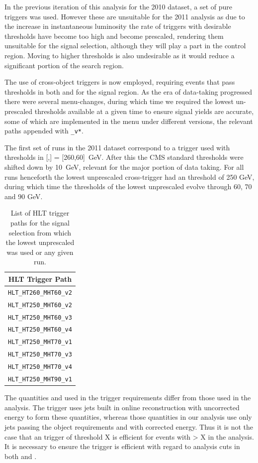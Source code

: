 In the previous iteration of this analysis for the 2010 dataset, a set of pure \HT triggers was used. However these are unsuitable for the 2011 analysis as due to the increase in instantaneous luminosity the rate of triggers with desirable thresholds have become too high and become prescaled, rendering them unsuitable for the signal selection, although they will play a part in the control region. Moving to higher \HT thresholds is also undesirable as it would reduce a significant portion of the search region. 

The use of cross-object triggers is now employed, requiring events that pass thresholds in both \HT and \mht for the signal region. As the era of data-taking progressed there were several menu-changes, during which time we required the lowest un-prescaled thresholds available at a given time to ensure signal yields are accurate, some of which are implemented in the menu under different versions, the relevant paths appended with \verb!_v*!. 

The first set of runs in the 2011 dataset correspond to a trigger used with thresholds in [\HT,\MHT] = [260,60]~GeV.  After this the CMS standard thresholds were shifted down by 10~GeV, relevant for the major portion of data taking. For all runs henceforth the lowest unprescaled cross-trigger had an \HT threshold of 250 GeV, during which time the \MHT thresholds of the lowest unprescaled evolve through 60, 70 and 90 GeV. 

\begin{table}[htbp]
\centering
\begin{tabular}{c}
\hline
\hline
HLT Trigger Path\\ 
\hline
\hline
\verb!HLT_HT260_MHT60_v2!\\
\verb!HLT_HT250_MHT60_v2!\\
\verb!HLT_HT250_MHT60_v3!\\
\verb!HLT_HT250_MHT60_v4!\\
\verb!HLT_HT250_MHT70_v1!\\
\verb!HLT_HT250_MHT70_v3!\\
\verb!HLT_HT250_MHT70_v4!\\
\verb!HLT_HT250_MHT90_v1!\\
\hline
\end{tabular}
\caption{\label{tab:sigtrig}List of HLT trigger paths for the signal selection from which the lowest unprescaled was used or any given run.}
\end{table}

The quantities \HT and \MHT used in the trigger requirements differ from those used in the analysis. The trigger uses jets built in online reconstruction with uncorrected energy to form these quantities, whereas those quantities in our analysis use only jets passing the object requirements and with corrected energy. Thus it is not the case that an \HT trigger of threshold X is efficient for events with \HT > X in the analysis. It is necessary to ensure the trigger is efficient with regard to analysis cuts in both \HT and \MHT. 

